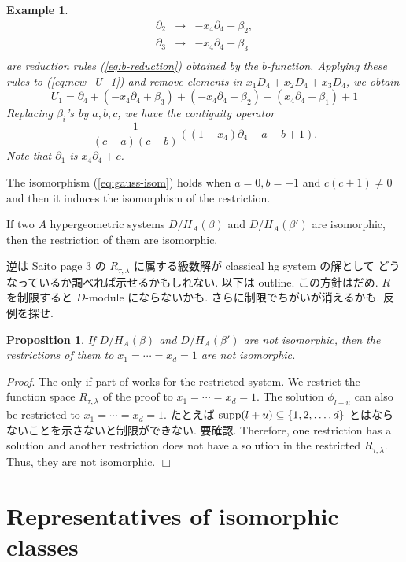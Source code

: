 \documentclass{article}
\def\memo#1{{\color{blue} #1}}
\def\pd#1{\partial_{#1}}
\def\qed{\hfill $\Box$ \medbreak}
\newtheorem{proposition}{Proposition}
\newtheorem{example}{Example}
\begin{document}
\begin{example}
\begin{eqnarray}
\pd{2} &\rightarrow& -x_4 \pd{4} + \beta_2, \\
\pd{3} &\rightarrow& -x_4 \pd{4} + \beta_3 \\
\end{eqnarray}
are reduction rules (\ref{eq:b-reduction}) obtained by the $b$-function.
Applying these rules to (\ref{eq:new_U_1}) and remove elements in 
$x_1D_4+x_2D_4+x_3D_4$,
we obtain
\begin{equation}
{\bar {U_1}} =
 \pd{4} + (-x_4 \pd{4} + \beta_3)
+(-x_4 \pd{4} + \beta_2)  + (x_4 \pd{4} + \beta_1) + 1
\end{equation}
Replacing $\beta_i$'s by $a,b,c$, we have the contiguity operator
\begin{equation}
\frac{1}{(c-a)(c-b)}\left(
 (1-x_4) \pd{4} - a - b + 1 \right).
\end{equation}
Note that $\bar {\pd{1}}$ is $x_4 \pd{4} + c$.
\end{example}

The isomorphism (\ref{eq:gauss-isom})  holds when
$a=0, b=-1$ and $c(c+1) \not=0$ and then
it induces the isomorphism of the restriction.


If two $A$ hypergeometric systems
$D/H_A(\beta)$ and $D/H_A(\beta')$ are
isomorphic, then the restriction 
of them are isomorphic.

\memo{逆は Saito  page 3 の $R_{\tau,\lambda}$
に属する級数解が classical hg system の解として
どうなっているか調べれば示せるかもしれない. 以下は outline.
この方針はだめ. $R$ を制限すると $D$-module にならないかも.
さらに制限でちがいが消えるかも. 反例を探せ.}
\begin{proposition}
If $D/H_A(\beta)$ and $D/H_A(\beta')$ are
not isomorphic, then the restrictions
of them to $x_1=\cdots=x_d=1$ are not isomorphic.
\end{proposition}
{\it Proof}\/.
The only-if-part of \cite[Theorem 2.1, p.325]{saito-isom} works
for the restricted system.
We restrict the function space $R_{\tau,\lambda}$ of the proof
to $x_1=\cdots=x_d=1$.
The solution $\phi_{l+u}$ can also be restricted to $x_1=\cdots=x_d=1$.
\memo{たとえば ${\rm supp}(l+u) \subseteq \{1, 2, \ldots, d\}$ 
とはならないことを示さないと制限ができない. 要確認.}
Therefore, one restriction has a solution and another restriction does not
have a solution in the restricted $R_{\tau,\lambda}$.
Thus, they are not isomorphic.
\qed
\fi

\section{Representatives of isomorphic classes} \label{sec:isom}
\end{document}
